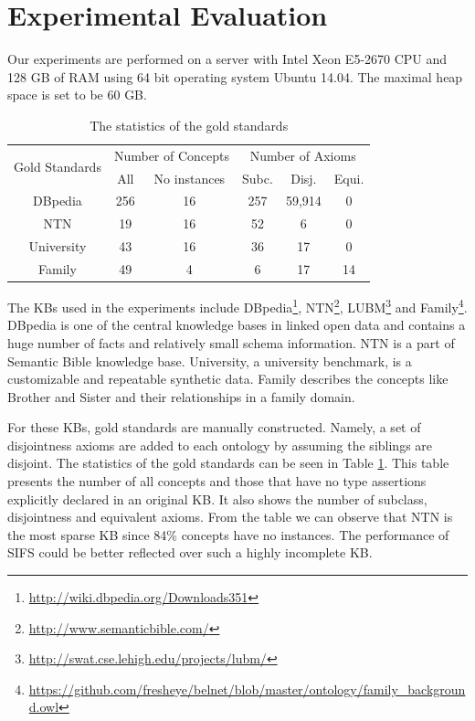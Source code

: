 \section{Experimental Evaluation}\label{sec:res}
Our experiments are performed on a server with Intel Xeon E5-2670 CPU and 128 GB of RAM using 64 bit operating system Ubuntu 14.04. The maximal heap space is set to be 60 GB.


\begin{table}[t]
\begin{center}
\begin{footnotesize}
\begin{tabular}{|c|c|c|c|c|c|}
\hline
\multirow{2}{1.7cm}{Gold Standards} & \multicolumn{2}{|c|}{Number of Concepts} & \multicolumn{3}{|c|}{Number of Axioms}  \\
   &  All & No instances & Subc. & Disj. &  Equi.  \\\hline
DBpedia & 256& 16 & 257 & 59,914  & 0 \\\hline
NTN & 19& 16 & 52 & 6  & 0 \\\hline
University& 43& 16 & 36 & 17 & 0 \\\hline
Family & 49& 4 & 6 & 17  & 14 \\\hline
\end{tabular}
\end{footnotesize}
\caption{The statistics of the gold standards}\label{tab:gold-standard}
\end{center}
\end{table}

The KBs used in the experiments include DBpedia\footnote{\url{http://wiki.dbpedia.org/Downloads351}}, NTN\footnote{\url{http://www.semanticbible.com/}}, LUBM\footnote{\url{http://swat.cse.lehigh.edu/projects/lubm/}} and Family\footnote{\url{https://github.com/fresheye/belnet/blob/master/ontology/family\_background.owl}}. DBpedia is one of the central knowledge bases in linked open data and contains a huge number of facts and relatively small schema information. 
%
NTN  is a part of Semantic Bible knowledge base.
%
\textsf{University}, a university benchmark, is a customizable and repeatable synthetic data.
%
\textsf{Family} describes the concepts like \textsf{Brother} and \textsf{Sister} and their relationships in a family domain.

For these KBs, gold standards are manually constructed. Namely, a set of disjointness axioms are added to each ontology by assuming the siblings are disjoint. The statistics of the gold standards can be seen in Table \ref{tab:gold-standard}. This table presents the number of all concepts and those that have no type assertions explicitly declared in an original KB. It also shows the number of subclass, disjointness and equivalent axioms. From the table we can observe that NTN is  the most sparse KB since 84\%  concepts have no instances. The performance of SIFS could be better reflected over such a highly incomplete KB.

